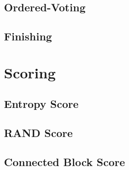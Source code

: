 		\subsection{Ordered-Voting}
			\clearpage
		
		\subsection{Finishing}
			\clearpage
	
	\section{Scoring}
	
		\subsection{Entropy Score}
			\clearpage
		
		\subsection{RAND Score}
			\clearpage
		
		\subsection{Connected Block Score}
			\clearpage
